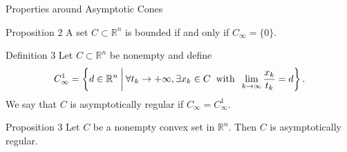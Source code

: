 \documentclass[aspectratio=169, dvipdfmx, 11pt]{beamer} %
\newcommand{\NDemenstionalRealEuclideanSpace}{\mathbb{R}^n}
\begin{document}
\begin{frame}{Properties around Asymptotic Cones}
    \begin{block}{Proposition 2}
    A set $C \subset \mathbb{R}^n$ is bounded if and only if $C_\infty = \{0\}$.
    \end{block}

    \begin{block}{Definition 3}
    Let $C \subset \NDemenstionalRealEuclideanSpace$ be nonempty and define
    \begin{equation}
        C_{\infty}^1 = \left\{d \in \NDemenstionalRealEuclideanSpace \:\middle|\: \forall t_k \rightarrow + \infty , \exists x_k \in C \:\text{ with }\: \lim_{k \to \infty} \frac{x_k}{t_k} = d \right\}. \notag
    \end{equation}
    We say that $C$ is asymptotically regular if $C_{\infty} = C_{\infty}^1$.
    \end{block}

    \begin{block}{Proposition 3}
    Let $C$ be a nonempty convex set in $\NDemenstionalRealEuclideanSpace$. Then $C$ is asymptotically regular.
    \end{block}
\end{frame}
\end{document}

